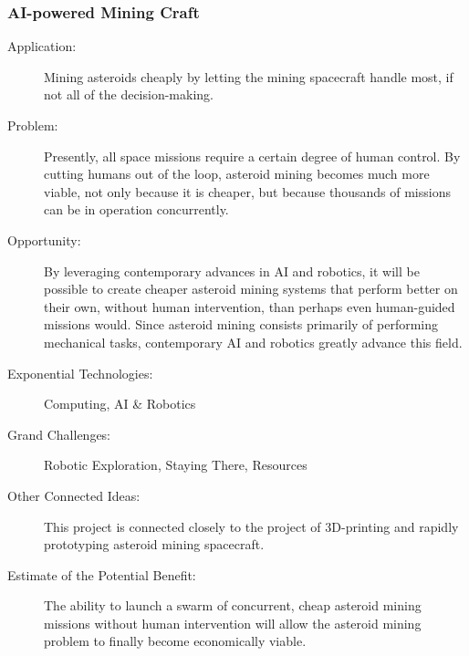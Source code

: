  \subsubsection{AI-powered Mining Craft}
 \label{auto-explore}
\begin{description}


\item[Application:]

Mining asteroids cheaply by letting the mining spacecraft handle most,
if not all of the decision-making.


\item[Problem:]

Presently, all space missions require a certain degree of human control.
By cutting humans out of the loop, asteroid mining becomes much more
viable, not only because it is cheaper, but because thousands of missions
can be in operation concurrently.


\item[Opportunity:]

By leveraging contemporary advances in AI and robotics, it will be
possible to create cheaper asteroid mining systems that perform better
on their own, without human intervention, than perhaps even human-guided
missions would. Since asteroid mining consists primarily of performing
mechanical tasks, contemporary AI and robotics greatly advance this
field.


\item[Exponential Technologies:]

Computing, AI \& Robotics


\item[Grand Challenges:]

Robotic Exploration, Staying There, Resources


\item[Other Connected Ideas:]

This project is connected closely to the project of 3D-printing and
rapidly prototyping asteroid mining spacecraft.


\item[Estimate of the Potential Benefit:]

The ability to launch a swarm of concurrent, cheap asteroid mining
missions without human intervention will allow the asteroid mining
problem to finally become economically viable.



\end{description}
